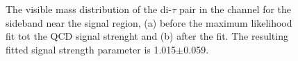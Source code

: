 \begin{figure}[h!]
\begin{center}
\end{center}
\caption{The visible mass distribution of the di-$\tau$ pair in the \etau channel for the sideband near the signal region, (a) before
the maximum likelihood fit tot the QCD signal strenght and (b) after the fit. The resulting fitted signal strength parameter
is 1.015$\pm$0.059.}
\label{fig:mssm_qcdossss_etnear}
\end{figure}

